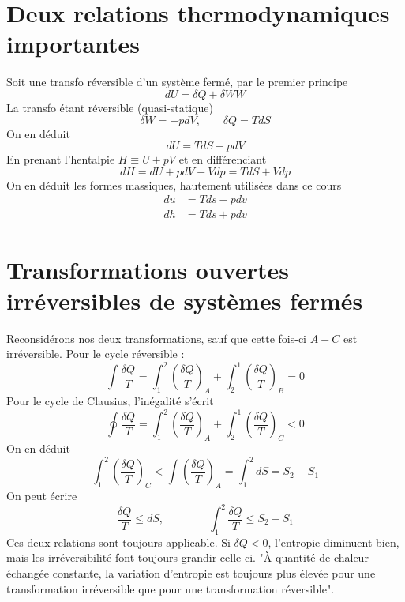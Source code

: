 		\newpage
		
	\section{Deux relations thermodynamiques importantes}
	Soit une transfo réversible d'un système fermé, par le premier principe 
	\begin{equation}
	dU = \delta Q + \delta WW
	\end{equation}
	La transfo étant réversible (quasi-statique)
	\begin{equation}
	\delta W = -pdV,\qquad \delta Q = TdS
	\end{equation}
	On en déduit
	\begin{equation}
	dU = TdS - pdV
	\end{equation}
	En prenant l'hentalpie $H \equiv U + pV$ et en différenciant 
	\begin{equation}
	dH = dU + pdV + Vdp = TdS + Vdp
	\end{equation}
	On en déduit les formes massiques, hautement utilisées dans ce cours
	\begin{equation}
	\begin{array}{ll}
	du &= Tds- pdv\\
	dh &= Tds + pdv
	\end{array}
	\end{equation}
	
	\section{Transformations ouvertes irréversibles de systèmes fermés}
	Reconsidérons nos deux transformations, sauf que cette fois-ci $A-C$ est 
	irréversible. Pour le cycle réversible :
	\begin{equation}
	\int \dfrac{\delta Q}{T} = \int_1^2 \left(\dfrac{\delta Q}{T}\right)_A + 
	\int_2^1 \left(\dfrac{\delta Q}{T}\right)_B = 0
	\end{equation}
	Pour le cycle de Clausius, l'inégalité s'écrit
	\begin{equation}
		\oint \dfrac{\delta Q}{T} = \int_1^2 \left(\dfrac{\delta Q}{T}\right)_A + 
	\int_2^1 \left(\dfrac{\delta Q}{T}\right)_C < 0
	\end{equation}
	On en déduit
	\begin{equation}
	\int_1^2\left(\dfrac{\delta Q}{T}\right)_C < \int \left(\dfrac{\delta Q}{T}
	\right)_A = \int_1^2 dS = S_2-S_1
	\end{equation}
	On peut écrire
	\begin{equation}
	\dfrac{\delta Q}{T} \leq dS,\qquad\qquad \int_1^2 \dfrac{\delta Q}{T} \leq 
	S_2-S_1
	\end{equation}
	Ces deux relations sont toujours applicable. Si $\delta Q <0$, l'entropie 
	diminuent bien, mais les irréversibilité font toujours grandir celle-ci. 
	"À quantité de chaleur échangée constante, la variation d’entropie est 
	toujours plus élevée pour une transformation irréversible que pour une 
	transformation réversible".
	
